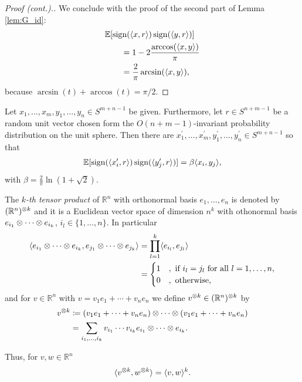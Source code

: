 	\begin{frame}
		\begin{proof}[Proof (cont.).]
			We conclude with the proof of the second part of Lemma \ref{lem:G_id}: 
			\begin{align*}
				&\mathbb{E}[\operatorname{sign}(\langle{x},{r}\rangle) \operatorname{sign}(\langle{y},{r}\rangle)] \\
				&\qquad= 1 - 2 \frac{\arccos(\langle{x},{y}\rangle)}{\pi} \\
				&\qquad= \frac{2}{\pi} \arcsin(\langle{x},{y}\rangle),
			\end{align*}
			because $\arcsin (t) + \arccos(t) = \pi/2$.
		\end{proof}
	\end{frame}
	\begin{frame}
		\begin{lemma}\label{lem:krivines_trick}
			Let $x_1,\dots,x_m,y_1,\dots,y_n\in S^{m+n-1}$ be given. Furthermore, let $r\in S^{n+m-1}$ be a random unit vector chosen form the $O(n+m-1)$-invariant probability distribution on the unit sphere. Then there are $x_1^\prime,\dots,x_m^\prime, y_1^\prime,\dots,y_n^\prime\in S^{m+n-1}$ so that
			\begin{equation}
				\mathbb{E}[\operatorname{sign}(\langle{x_i^\prime},{r}\rangle)\operatorname{sign}(\langle{y_j^\prime},{r}\rangle)] = \beta \langle{x_i},{y_j}\rangle,
				\label{eq:krivines_trick}
			\end{equation}		
			with $\beta = \frac{2}{\pi} \ln (1+\sqrt{2}).$
		\end{lemma}
	\end{frame}
	\begin{frame}
		\begin{definition}
			The \emph{$k$-th tensor product} of $\mathbb{R}^n$ with orthonormal basis $e_1,\dots,e_n$ is denoted by $(\mathbb{R}^n)^{\otimes k}$ and it is a Euclidean vector space of dimension $n^k$ with othonormal basis $e_{i_1}\otimes \cdots \otimes e_{i_k}$, $i_l\in\{1,\dots,n\}$. In particular 
			\begin{align}
				\langle{e_{i_1}\ensuremath{\otimes}\cdots \ensuremath{\otimes}e_{i_k}},{e_{j_1}\otimes \cdots \otimes e_{j_k}}\rangle
			&= \prod_{l=1}^k \langle{e_{i_l}},{e_{j_l}}\rangle\nonumber\\
			&=\begin{cases}
				1 & , \text{ if } i_l=j_l \text{ for all } l=1,\dots,n,\\
				0 & , \text{ otherwise},
			\end{cases} \label{eq:orthonormtensor}
			\end{align}
			and for $v\in\mathbb{R}^n$ with $v=v_1e_1+\cdots +v_ne_n$ we define $v^{\otimes k} \in (\mathbb{R}^n)^{\otimes k}$ by 
			\begin{align}
				v^{\otimes k} &\coloneqq (v_1e_1 + \cdots + v_ne_n) \otimes \cdots \otimes (v_1e_1 + \cdots + v_ne_n) \nonumber\\
				&= \sum_{i_1,\dots,i_k} v_{i_1}\cdots v_{i_k} e_{i_1}\otimes\cdots\otimes e_{i_k}.
			\end{align}	
		\end{definition}
		Thus, for $v,w\in\mathbb{R}^n$ 
		\begin{align}
			\langle{v^{\ensuremath{\otimes}k}},{w^{\otimes k}}\rangle
			= \langle{v},{w}\rangle^k. \label{eq:kth_tensor}
		\end{align}
	\end{frame}
